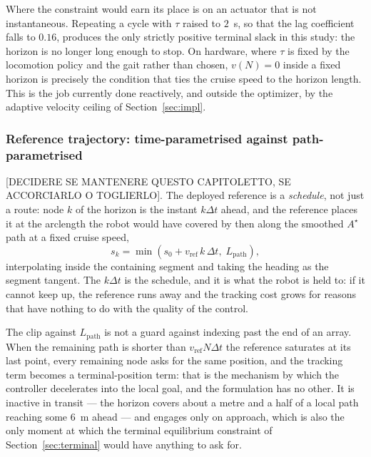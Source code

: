 \documentclass[11pt,a4paper]{article}
\newcommand{\astar}{$A^\star$}
\begin{document}
Where the constraint would earn its place is on an actuator that is not instantaneous. Repeating a cycle
with $\tau$ raised to $2$~s, so that the lag coefficient falls to $0.16$, produces the only strictly positive
terminal slack in this study: the horizon is no longer long enough to stop. On hardware, where $\tau$ is fixed by the locomotion policy and the gait
rather than chosen, $v(N)=0$ inside a fixed horizon is precisely the condition that ties the cruise speed to
the horizon length. This is the job currently done reactively, and outside the optimizer, by the adaptive
velocity ceiling of Section~\ref{sec:impl}.

\subsubsection{Reference trajectory: time-parametrised against path-parametrised}
\label{sec:pathfollow}

[DECIDERE SE MANTENERE QUESTO CAPITOLETTO, SE ACCORCIARLO O TOGLIERLO].
The deployed reference is a \emph{schedule}, not just a route: node $k$ of the horizon is the instant
$k\Delta t$ ahead, and the reference places it at the arclength the robot would have covered by then along
the smoothed \astar{} path at a fixed cruise speed,
\begin{equation}
  s_k=\min\!\left(s_0+v_{\mathrm{ref}}\,k\,\Delta t,\; L_{\mathrm{path}}\right),
  \label{eq:ref}
\end{equation}
interpolating inside the containing segment and taking the heading as the segment tangent. The $k\Delta t$
is the schedule, and it is what the robot is held to: if it cannot keep up, the reference runs away and the
tracking cost grows for reasons that have nothing to do with the quality of the control.

The clip against $L_{\mathrm{path}}$ is not a guard against indexing past the end of an array. When the
remaining path is shorter than $v_{\mathrm{ref}}N\Delta t$ the reference saturates at its last point, every
remaining node asks for the same position, and the tracking term becomes a terminal-position term: that is
the mechanism by which the controller decelerates into the local goal, and the formulation has no other. It
is inactive in transit --- the horizon covers about a metre and a half of a local path reaching some $6$~m
ahead --- and engages only on approach, which is also the only moment at which the terminal equilibrium
constraint of Section~\ref{sec:terminal} would have anything to ask for.
\end{document}
